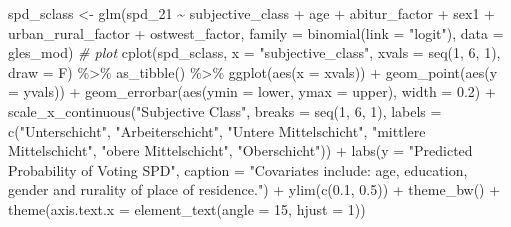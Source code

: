 \documentclass[
]{article}
\newenvironment{Shaded}{\begin{snugshade}}{\end{snugshade}}
\newcommand{\AttributeTok}[1]{\textcolor[rgb]{0.77,0.63,0.00}{#1}}
\newcommand{\CommentTok}[1]{\textcolor[rgb]{0.56,0.35,0.01}{\textit{#1}}}
\newcommand{\DecValTok}[1]{\textcolor[rgb]{0.00,0.00,0.81}{#1}}
\newcommand{\FloatTok}[1]{\textcolor[rgb]{0.00,0.00,0.81}{#1}}
\newcommand{\FunctionTok}[1]{\textcolor[rgb]{0.00,0.00,0.00}{#1}}
\newcommand{\NormalTok}[1]{#1}
\newcommand{\OtherTok}[1]{\textcolor[rgb]{0.56,0.35,0.01}{#1}}
\newcommand{\SpecialCharTok}[1]{\textcolor[rgb]{0.00,0.00,0.00}{#1}}
\newcommand{\StringTok}[1]{\textcolor[rgb]{0.31,0.60,0.02}{#1}}
\begin{document}
\begin{Shaded}
\begin{Highlighting}[]
\NormalTok{spd\_sclass }\OtherTok{\textless{}{-}} \FunctionTok{glm}\NormalTok{(spd\_21 }\SpecialCharTok{\textasciitilde{}}\NormalTok{ subjective\_class }\SpecialCharTok{+}\NormalTok{ age }\SpecialCharTok{+}\NormalTok{ abitur\_factor }\SpecialCharTok{+}\NormalTok{ sex1 }\SpecialCharTok{+}\NormalTok{ urban\_rural\_factor }\SpecialCharTok{+}\NormalTok{ ostwest\_factor, }
                  \AttributeTok{family =} \FunctionTok{binomial}\NormalTok{(}\AttributeTok{link =} \StringTok{"logit"}\NormalTok{), }
                  \AttributeTok{data =}\NormalTok{ gles\_mod)}
\CommentTok{\# plot }
\FunctionTok{cplot}\NormalTok{(spd\_sclass, }\AttributeTok{x =} \StringTok{"subjective\_class"}\NormalTok{, }
      \AttributeTok{xvals =} \FunctionTok{seq}\NormalTok{(}\DecValTok{1}\NormalTok{, }\DecValTok{6}\NormalTok{, }\DecValTok{1}\NormalTok{), }\AttributeTok{draw =}\NormalTok{ F) }\SpecialCharTok{\%\textgreater{}\%}
  \FunctionTok{as\_tibble}\NormalTok{() }\SpecialCharTok{\%\textgreater{}\%}
  \FunctionTok{ggplot}\NormalTok{(}\FunctionTok{aes}\NormalTok{(}\AttributeTok{x =}\NormalTok{ xvals)) }\SpecialCharTok{+}
  \FunctionTok{geom\_point}\NormalTok{(}\FunctionTok{aes}\NormalTok{(}\AttributeTok{y =}\NormalTok{ yvals)) }\SpecialCharTok{+}
  \FunctionTok{geom\_errorbar}\NormalTok{(}\FunctionTok{aes}\NormalTok{(}\AttributeTok{ymin =}\NormalTok{ lower, }\AttributeTok{ymax =}\NormalTok{ upper), }\AttributeTok{width =} \FloatTok{0.2}\NormalTok{) }\SpecialCharTok{+}
  \FunctionTok{scale\_x\_continuous}\NormalTok{(}\StringTok{"Subjective Class"}\NormalTok{, }
                     \AttributeTok{breaks =} \FunctionTok{seq}\NormalTok{(}\DecValTok{1}\NormalTok{, }\DecValTok{6}\NormalTok{, }\DecValTok{1}\NormalTok{), }
                     \AttributeTok{labels =} \FunctionTok{c}\NormalTok{(}\StringTok{"Unterschicht"}\NormalTok{, }\StringTok{"Arbeiterschicht"}\NormalTok{, }
                                \StringTok{"Untere Mittelschicht"}\NormalTok{, }\StringTok{"mittlere Mittelschicht"}\NormalTok{, }
                                \StringTok{"obere Mittelschicht"}\NormalTok{, }\StringTok{"Oberschicht"}\NormalTok{)) }\SpecialCharTok{+}
  \FunctionTok{labs}\NormalTok{(}\AttributeTok{y =} \StringTok{"Predicted Probability of Voting SPD"}\NormalTok{, }
       \AttributeTok{caption =} \StringTok{"Covariates include: age, education, gender and rurality of place of residence."}\NormalTok{) }\SpecialCharTok{+}
  \FunctionTok{ylim}\NormalTok{(}\FunctionTok{c}\NormalTok{(}\FloatTok{0.1}\NormalTok{, }\FloatTok{0.5}\NormalTok{)) }\SpecialCharTok{+}
  \FunctionTok{theme\_bw}\NormalTok{() }\SpecialCharTok{+}
  \FunctionTok{theme}\NormalTok{(}\AttributeTok{axis.text.x =} \FunctionTok{element\_text}\NormalTok{(}\AttributeTok{angle =} \DecValTok{15}\NormalTok{, }\AttributeTok{hjust =} \DecValTok{1}\NormalTok{))}
\end{Highlighting}
\end{Shaded}
\end{document}
